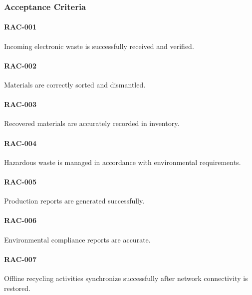 
\subsubsection*{Acceptance Criteria}

\paragraph{RAC-001}

Incoming electronic waste is successfully received and verified.

\paragraph{RAC-002}

Materials are correctly sorted and dismantled.

\paragraph{RAC-003}

Recovered materials are accurately recorded in inventory.

\paragraph{RAC-004}

Hazardous waste is managed in accordance with environmental
requirements.

\paragraph{RAC-005}

Production reports are generated successfully.

\paragraph{RAC-006}

Environmental compliance reports are accurate.

\paragraph{RAC-007}

Offline recycling activities synchronize successfully after network
connectivity is restored.

